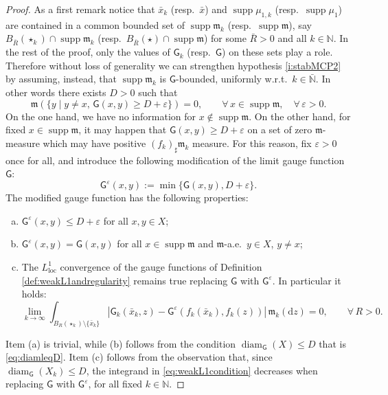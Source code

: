 \documentclass[11pt,a4paper]{article}
\theoremstyle{plain}
\theoremstyle{definition}
\theoremstyle{remark}
\numberwithin{equation}{section}
\newcommand{\N}{\mathbb{N}} %
\DeclareMathOperator{\supp}{\mathrm{supp}}
\newcommand{\ve}{\varepsilon}
\newcommand{\loc}{\mathrm{loc}}
\DeclareMathOperator{\diam}{\mathrm{diam}}
\newcommand{\di}{\mathrm{d}}
\newcommand{\mm}{\mathfrak m}
\newcommand{\sfG}{\mathsf G}
\begin{document}
\begin{proof}
 As a first remark notice that $\bar{x}_k$ (resp.\ $\bar{x}$) and $\supp\mu_{1,k}$ (resp.\ $\supp\mu_1$) are contained in a common bounded set of $\supp\mm_k$ (resp.\ $\supp\mm$), say $B_{\bar{R}}(\star_k)\cap \supp\mm_k$ (resp.\ $B_{\bar{R}}(\star)\cap \supp\mm$) for some $\bar{R}>0$ and all $k\in \N$. In the rest of the proof, only the values of $\sfG_k$ (resp.\ $\sfG$) on these sets play a role. Therefore without loss of generality we can strengthen hypothesis \ref{i:stabMCP2} by assuming, instead, that $\supp\mm_k$ is $\sfG$-bounded, uniformly w.r.t.\ $k\in \bar{\N}$. In other words there exists $D>0$ such that
\begin{equation}\label{eq:diamleqD}
\mm(\{y\mid  y\neq x,\,  \sfG(x,y)\geq D+\ve\}) =0, \qquad \forall\, x\in \supp\mm,\quad \forall\, \ve>0.
\end{equation}
On the one hand, we have no information for $x\notin\supp\mm$. On the other hand, for fixed $x\in\supp\mm$, it may happen that $\sfG(x,y)\geq D+\ve$ on a set of zero $\mm$-measure which may have positive $(f_k)_\sharp \mm_k$ measure. For this reason, fix $\ve>0$ once for all, and introduce the following modification of the limit gauge function $\sfG$:
\begin{equation}\label{eq:defTrunc}
\sfG^{\ve}(x,y):=\min\{\sfG(x,y),D+\ve\}.
\end{equation}
The modified gauge function has the following properties:
\begin{enumerate}[(a)]
\item $\sfG^{\ve}(x,y) \leq D+\ve$ for all $x,y\in X$;
\item $\sfG^{\ve}(x,y) = \sfG(x,y)$ for all $x\in \supp\mm$ and $\mm$-a.e.\ $y\in X$,  $y\neq x$;
\item The $L^1_{\loc}$ convergence of the gauge functions of Definition \ref{def:weakL1andregularity} remains true replacing $\sfG$ with $\sfG^{\ve}$. In particular it holds:
\begin{equation}
\lim_{k\to \infty}\int_{B_R(\star_k){\setminus \{\bar{x}_k\}}}|\sfG_k(\bar{x}_k,z)-\sfG^\ve(f_k(\bar{x}_k),f_k(z))| \, \mm_{k}(\di z) =0, \qquad \forall\, R>0.
\end{equation}
\end{enumerate}
Item (a) is trivial, while (b) follows from the condition $\diam_{\sfG}(X) \leq D$ that is \eqref{eq:diamleqD}. Item (c) follows from the observation that, since $\diam_{\sfG}(X_k)\leq D$, the integrand in \eqref{eq:weakL1condition} decreases when replacing $\sfG$ with $\sfG^{\ve}$, for all fixed $k\in \N$.


\end{proof}
\end{document}
